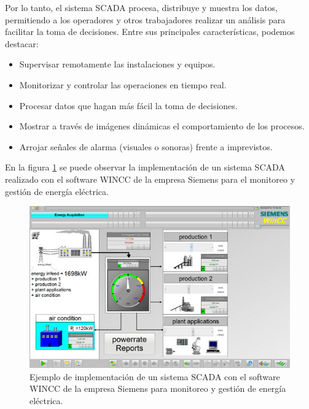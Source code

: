 Por lo tanto, el sistema SCADA procesa, distribuye y muestra los datos, permitiendo a los operadores y otros trabajadores realizar un análisis para facilitar la toma de decisiones. Entre sus principales características, podemos destacar:

\begin{itemize}
	\item Supervisar remotamente las instalaciones y equipos.
	\item Monitorizar y controlar las operaciones en tiempo real.
	\item Procesar datos que hagan más fácil la toma de decisiones.
	\item Mostrar a través de imágenes dinámicas el comportamiento de los procesos.
	\item Arrojar señales de alarma (visuales o sonoras) frente a imprevistos.
\end{itemize}

En la figura \ref{fig:wincc-siemens} se puede observar la implementación de un sistema SCADA realizado con el software WINCC \citep{WEBSITE:4}  de la empresa Siemens para el monitoreo y gestión de energía eléctrica. 

\begin{figure}[htpb]
	\centering
	\includegraphics[scale=.7]{./Figures/wincc-siemens.jpg}
	\caption[Implementación de sistema SCADA con WINCC]{Ejemplo de implementación de un sistema SCADA con el software WINCC de la empresa Siemens para monitoreo y gestión de energía eléctrica\protect\footnotemark.}
	\label{fig:wincc-siemens}
\end{figure}


